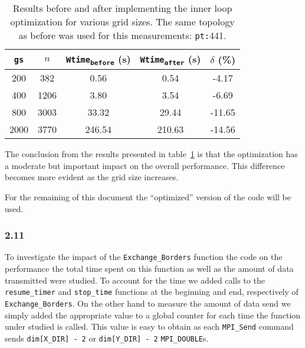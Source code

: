 \begin{table}[H] 
\centering
\begin{tabular}{*{5}{c}}
 \toprule
\texttt{gs}  &  $n$   &  \texttt{Wtime\textsubscript{before}} (\si{s})  &  \texttt{Wtime\textsubscript{after}} (\si{s})  & $\delta$ (\%) \\ \midrule
200          &   382  &  0.56                                           &  0.54                                          &  -4.17        \\
400          &  1206  &  3.80                                           &  3.54                                          &  -6.69        \\
800          &  3003  &  33.32                                          &  29.44                                         &  -11.65       \\
2000         &  3770  &  246.54                                         &  210.63                                        &  -14.56       \\
\bottomrule
\end{tabular}
\caption{Results before and after implementing the inner loop optimization for various grid sizes.
The same topology as before was used for this measurements: \texttt{pt:}441.}
\label{tbl:optimization}
\end{table}

The conclusion from the results presented in table~\ref{tbl:optimization} is that the optimization has a moderate but important impact on the overall performance. This difference becomes more evident as the grid size increases.

For the remaining of this document the ``optimized'' version of the code will be used.

\subsubsection{2.11}

To investigate the impact of the \texttt{Exchange\_Borders} function the code on the performance the total time spent on this function as well as the amount of data transmitted were studied.
To account for the time we added calls to the \texttt{resume\_timer} and \texttt{stop\_time} functions at the beginning and end, respectively of \texttt{Exchange\_Borders}.
On the other hand to measure the amount of data send we simply added the appropriate value to a global counter for each time the function under studied is called. This value is easy to obtain as each \texttt{MPI\_Send} command sends \texttt{dim[X\_DIR] - 2} or \texttt{dim[Y\_DIR] - 2} \texttt{MPI\_DOUBLE}s.

